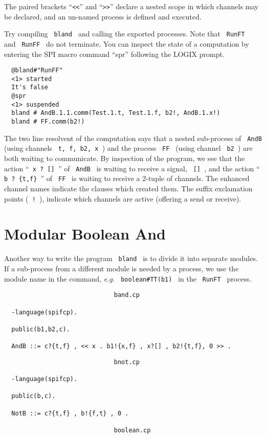 \noindent
The paired brackets ``\verb+<<+'' and ``\verb+>>+'' declare
a nested scope in which channels may be declared, and an
un-named process is defined and executed.

\noindent
Try compiling \verb+ bland + and calling the exported processes.
Note that \verb+ RunFT + and \verb+ RunFF + do not terminate.  You
can inspect the state of a computation by entering the SPI macro command
``spr'' following the LOGIX prompt.

\begin{verbatim}
  @bland#"RunFF"
  <1> started
  It's false
  @spr
  <1> suspended
  bland # AndB.1.1.comm(Test.1.t, Test.1.f, b2!, AndB.1.x!)
  bland # FF.comm(b2!)
\end{verbatim}

\noindent
The two line resolvent of the computation says that a nested sub-process of
\verb+ AndB + (using channels \verb+ t, f, b2, x +) and the process
\verb+ FF + (using channel \verb+ b2 +) are both waiting to communicate.
By inspection of the program, we see that the action ``\verb+ x ? [] +''
of \verb+ AndB + is waiting to receive a signal, \verb+ [] +, and the
action ``\verb+ b ? {t,f} +'' of \verb+ FF + is waiting to receive a
2-tuple of channels.  The enhanced channel names indicate the clauses
which created them.  The suffix exclamation points (\verb+ ! +),
indicate which channels are active (offering a send or receive).

\section{Modular Boolean And}
\label{mbland}
Another way to write the program \verb+ bland + is to divide it
into separate modules. If a sub-process from a different module is
needed by a process, we use the module name in the command, {\em e.g.}
\verb+ boolean#TT(b1) + in the \verb+ RunFT + process.

\begin{verbatim}
                              band.cp

  -language(spifcp).

  public(b1,b2,c).

  AndB ::= c?{t,f} , << x . b1!{x,f} , x?[] , b2!{t,f}, 0 >> .
\end{verbatim}

\begin{verbatim}
                              bnot.cp

  -language(spifcp).

  public(b,c).

  NotB ::= c?{t,f} , b!{f,t} , 0 .

                              boolean.cp
\end{verbatim}

